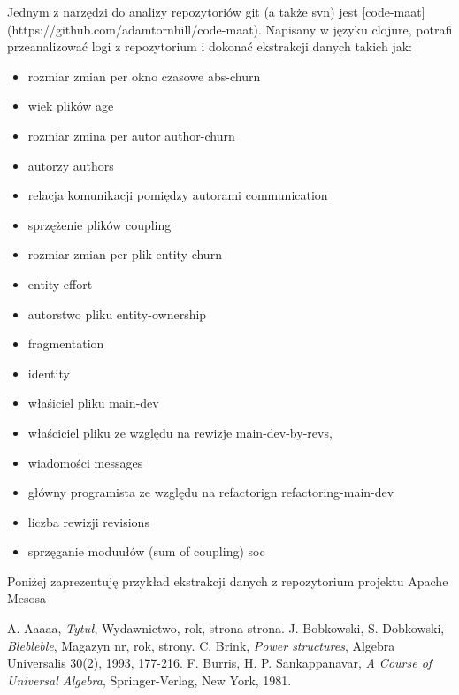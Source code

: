 \documentclass[a4paper,11pt,twoside]{report}
\theoremstyle{definition}
\begin{document}
 Jednym z narzędzi do analizy repozytoriów git (a także svn) jest 
[code-maat](https://github.com/adamtornhill/code-maat). Napisany w języku 
clojure, potrafi przeanalizować logi z repozytorium i dokonać ekstrakcji 
danych takich jak:
\begin{itemize}
    \item rozmiar zmian per okno czasowe abs-churn
    \item wiek plików age
    \item rozmiar zmina per autor author-churn
    \item autorzy authors
    \item relacja komunikacji pomiędzy autorami communication
    \item sprzężenie plików coupling
    \item rozmiar zmian per plik entity-churn
    \item entity-effort
    \item autorstwo pliku entity-ownership
    \item fragmentation
    \item identity
    \item właśiciel pliku main-dev
    \item właściciel pliku ze względu na rewizje main-dev-by-revs,
    \item wiadomości messages
    \item główny programista ze względu na refactorign refactoring-main-dev
    \item liczba rewizji revisions
    \item sprzęganie moduułów (sum of coupling) soc

\end{itemize}

Poniżej zaprezentuję przykład ekstrakcji danych z repozytorium projektu 
Apache Mesosa



\begin{thebibliography}{20}%

 A. Aaaaa, \emph{Tytuł}, Wydawnictwo, rok, strona-strona.
 J. Bobkowski, S. Dobkowski, \emph{Blebleble}, Magazyn nr, 
rok, strony.
 C. Brink, \emph{Power structures}, Algebra Universalis 30(2), 
1993, 177-216.
 F. Burris, H. P. Sankappanavar, \emph{A Course of Universal 
Algebra}, Springer-Verlag, New York, 1981.
\end{thebibliography}
\thispagestyle{empty}
\end{document}
